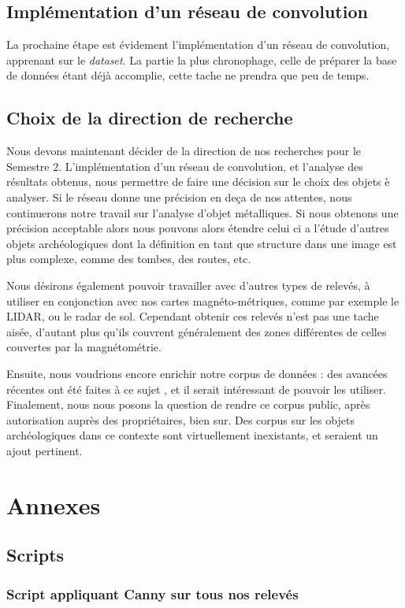 \documentclass[a4paper, 12pt, titlepage, oneside, french]{article}
\begin{document}
	\subsection{Implémentation d'un réseau de convolution}
	La prochaine étape est évidement l'implémentation d'un réseau de convolution, apprenant sur le \textit{dataset}. La partie la plus chronophage, celle de préparer la base de données étant déjà accomplie, cette tache ne prendra que peu de temps. 
	\subsection{Choix de la direction de recherche}
	Nous devons maintenant décider de la direction de nos recherches pour le Semestre 2. L'implémentation d'un réseau de convolution, et l'analyse des résultats obtenus, nous permettre de faire une décision sur le choix des objets è analyser. Si le réseau donne une précision en deça de nos attentes, nous continuerons notre travail sur l'analyse d'objet métalliques. Si nous obtenons une précision acceptable alors nous pouvons alors étendre celui ci a l'étude d'autres objets archéologiques dont la définition en tant que structure dans une image est plus complexe, comme des tombes, des routes, etc. 

	Nous désirons également pouvoir travailler avec d'autres types de relevés, à utiliser en conjonction avec nos cartes magnéto-métriques, comme par exemple le LIDAR, ou le radar de sol. Cependant obtenir ces relevés n'est pas une tache aisée, d'autant plus qu'ils couvrent généralement des zones différentes de celles couvertes par la magnétométrie.

	Ensuite, nous voudrions encore enrichir notre corpus de données : des avancées récentes ont été faites à ce sujet \cite{Transfo}, et il serait intéressant de pouvoir les utiliser. Finalement, nous nous posons la question de rendre ce corpus public, après autorisation auprès des propriétaires, bien sur. Des corpus sur les objets archéologiques dans ce contexte sont virtuellement inexistants, et seraient un ajout pertinent. 

\newpage
\section{Annexes}

	\subsection{Scripts}
	\subsubsection{Script appliquant Canny sur tous nos relevés}
	
\end{document}
